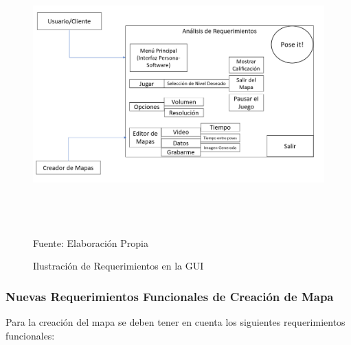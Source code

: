 \begin{figure}[t!]
	\centering
	\includegraphics[width=16cm,height=10cm,]{./Images/requerimientosposeit.png}
	\caption{Ilustración de Requerimientos en la GUI}
	\footnotesize Fuente: Elaboración Propia
	\label{requerimientosgrafico2}
\end{figure}

\subsubsection{Nuevas Requerimientos Funcionales de Creación de Mapa}

Para la creación del mapa se deben tener en cuenta los siguientes requerimientos funcionales:

